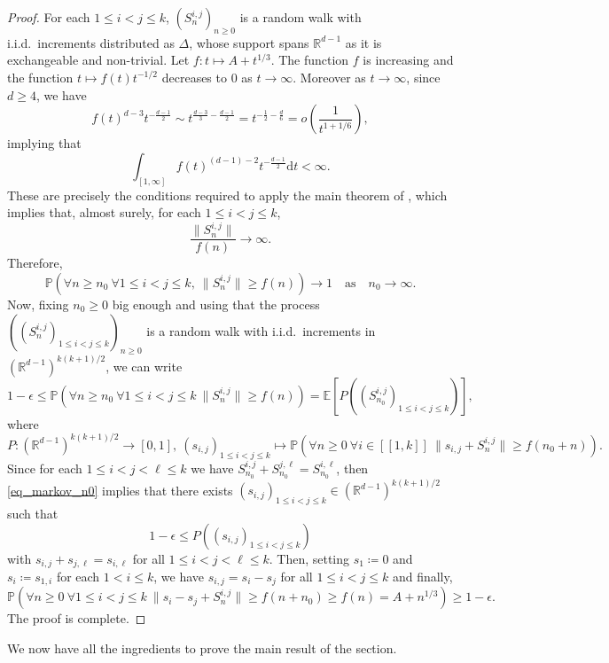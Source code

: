 \documentclass[a4paper, 11pt]{article}
\theoremstyle{plain}
\theoremstyle{definition}
\newcommand{\E}{\mathbb{E}}
\newcommand{\R}{\mathbb{R}}
\renewcommand{\P}{\mathbb{P}}
\newcommand{\range}[2]{[\![#1,#2]\!]}
\numberwithin{equation}{section}
\begin{document}
\begin{proof}
    For each $1\leq i<j\leq k$, $(S_n^{i,j})_{n\geq 0}$ is a random walk with i.i.d.\ increments distributed as $\Delta$, whose support spans $\R^{d-1}$ as it is exchangeable and non-trivial. Let $f:t\mapsto A+t^{1/3}$. The function $f$ is increasing and the function $t\mapsto f(t)t^{-1/2}$ decreases to $0$ as $t\to\infty$. Moreover as $t\to\infty$, since $d\geq 4$, we have
        \[f(t)^{d-3}t^{-\frac{d-1}{2}}\sim t^{\frac{d-3}{3}-\frac{d-1}{2}}=t^{-\frac{1}{2}-\frac{d}{6}}=o\left(\frac{1}{t^{1+1/6}}\right),\]
    implying that
        \[\int_{[1,\infty]}f(t)^{(d-1)-2}t^{-\frac{d-1}{2}}\mathrm dt<\infty.\]
    These are precisely the conditions required to apply the main theorem of \cite{KestenErickson}, which implies that, almost surely, for each $1\leq i<j\leq k$,
        \[\frac{\|S_n^{i,j}\|}{f(n)}\to\infty.\]
    Therefore,
        \[\P(\forall n\geq n_0~\forall 1\leq i<j\leq k,~\|S_n^{i,j}\|\geq f(n))\to 1\quad\text{as}\quad n_0\to\infty.\]
    Now, fixing $n_0\geq 0$ big enough and using that the process $((S_n^{i,j})_{1\leq i<j\leq k})_{n\geq0}$ is a random walk with i.i.d.\ increments in $(\R^{d-1})^{k(k+1)/2}$, we can write
        \begin{equation}
            \label{eq_markov_n0}
            1-\epsilon\leq\P(\forall n\geq n_0~\forall 1\leq i<j\leq k~\|S_n^{i,j}\|\geq f(n))
            =\E[P((S_{n_0}^{i,j})_{1\leq i<j\leq k})],
        \end{equation}
    where
        \[P:(\R^{d-1})^{k(k+1)/2}\to[0, 1],~(s_{i,j})_{1\leq i<j\leq k}\mapsto\P(\forall n\geq0~\forall i\in\range{1}{k}~\|s_{i,j}+S_n^{i,j}\|\geq f(n_0+n)).\]
    Since for each $1\leq i<j<\ell\leq k$ we have $S_{n_0}^{i,j}+S_{n_0}^{j,\ell}=S_{n_0}^{i,\ell}$, then \eqref{eq_markov_n0} implies that there exists $(s_{i,j})_{1\leq i<j\leq k}\in(\R^{d-1})^{k(k+1)/2}$ such that
        \[1-\epsilon\leq P((s_{i,j})_{1\leq i<j\leq k})\]
    with $s_{i,j}+s_{j, \ell}=s_{i, \ell}$ for all $1\leq i<j<\ell\leq k$. Then, setting $s_1\coloneqq 0$ and $s_i\coloneqq s_{1, i}$ for each $1< i\leq k$, we have $s_{i,j}=s_i-s_j$ for all $1\leq i<j\leq k$ and finally,
        \[\P(\forall n\geq0~\forall 1\leq i<j\leq k~\|s_i-s_j+S_n^{i, j}\|\geq f(n+n_0)\geq f(n)=A+n^{1/3})\geq 1-\epsilon.\]
    The proof is complete.
\end{proof}


We now have all the ingredients to prove the main result of the section.
\end{document}
